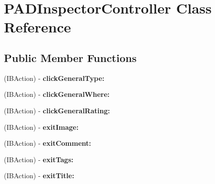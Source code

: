 \hypertarget{interface_p_a_d_inspector_controller}{
\section{PADInspectorController Class Reference}
\label{interface_p_a_d_inspector_controller}
}
\subsection*{Public Member Functions}
\begin{DoxyCompactItemize}
\item 
\hypertarget{interface_p_a_d_inspector_controller_a7e0a4bf959fdd8399d1113e7085b5357}{
(IBAction) -\/ {\bfseries clickGeneralType:}}
\label{interface_p_a_d_inspector_controller_a7e0a4bf959fdd8399d1113e7085b5357}

\item 
\hypertarget{interface_p_a_d_inspector_controller_aeddc7d13eb2267e2fd7d85510f7c00bb}{
(IBAction) -\/ {\bfseries clickGeneralWhere:}}
\label{interface_p_a_d_inspector_controller_aeddc7d13eb2267e2fd7d85510f7c00bb}

\item 
\hypertarget{interface_p_a_d_inspector_controller_afdeda7824fea36a8425cd58627d4b09e}{
(IBAction) -\/ {\bfseries clickGeneralRating:}}
\label{interface_p_a_d_inspector_controller_afdeda7824fea36a8425cd58627d4b09e}

\item 
\hypertarget{interface_p_a_d_inspector_controller_acbe7757764e433bfd58d6b3e77a9c3c4}{
(IBAction) -\/ {\bfseries exitImage:}}
\label{interface_p_a_d_inspector_controller_acbe7757764e433bfd58d6b3e77a9c3c4}

\item 
\hypertarget{interface_p_a_d_inspector_controller_ac290e52e716dc058bec3245e4998fc16}{
(IBAction) -\/ {\bfseries exitComment:}}
\label{interface_p_a_d_inspector_controller_ac290e52e716dc058bec3245e4998fc16}

\item 
\hypertarget{interface_p_a_d_inspector_controller_af79b2d1779b8caf54fc8eaeb9843cf5e}{
(IBAction) -\/ {\bfseries exitTags:}}
\label{interface_p_a_d_inspector_controller_af79b2d1779b8caf54fc8eaeb9843cf5e}

\item 
\hypertarget{interface_p_a_d_inspector_controller_a9823921cce4e81b287898a94ac57875c}{
(IBAction) -\/ {\bfseries exitTitle:}}
\label{interface_p_a_d_inspector_controller_a9823921cce4e81b287898a94ac57875c}


\end{DoxyCompactItemize}
